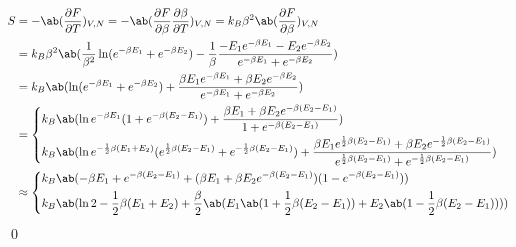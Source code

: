 \documentclass[uplatex,diffipdfmx,a4paper,11pt]{jlreq}
\makeatletter
\theoremstyle{definition}
\renewenvironment{proof}[1][\proofname]{\par
  \normalfont
  \topsep6\p@\@plus6\p@ \trivlist
  \item[\hskip\labelsep{\bfseries #1}\@addpunct{\bfseries}]\ignorespaces\quad\par
}{%
  \qed\endtrivlist\@endpefalse
}
\renewcommand\proofname{証明}
\makeatother
\begin{document}
\begin{proof}
\begin{align}
  \end{align}
  \begin{align}
    S & = - \ab(\diffp{F}{T})_{V,N} = - \ab(\diffp{F}{\beta}\diffp{\beta}{T})_{V,N} = k_B\beta^2\ab(\diffp{F}{\beta})_{V,N}                                                                                                                                                                                                                                                                   \\
      & = k_B\beta^2\ab(\frac{1}{\beta^2}\ln(e^{-\beta E_1} + e^{-\beta E_2}) - \frac{1}{\beta}\frac{-E_1e^{-\beta E_1} - E_2e^{-\beta E_2}}{e^{-\beta E_1} + e^{-\beta E_2}})                                                                                                                                                                                                                \\
      & = k_B\ab(\ln(e^{-\beta E_1} + e^{-\beta E_2}) + \frac{\beta E_1e^{-\beta E_1} + \beta E_2e^{-\beta E_2}}{e^{-\beta E_1} + e^{-\beta E_2}})                                                                                                                                                                                                                                            \\
      & = \begin{dcases}
            k_B\ab(\ln e^{-\beta E_1}(1 + e^{-\beta (E_2 - E_1)}) + \frac{\beta E_1 + \beta E_2e^{-\beta (E_2 - E_1)}}{1 + e^{-\beta (E_2 - E_1)}})                                                                                                                                                   \\
            k_B\ab(\ln e^{-\frac{1}{2}\beta (E_1 + E_2)}(e^{\frac{1}{2}\beta (E_2 - E_1)} + e^{-\frac{1}{2}\beta (E_2 - E_1)}) + \frac{\beta E_1e^{\frac{1}{2}\beta (E_2 - E_1)} + \beta E_2e^{-\frac{1}{2}\beta (E_2 - E_1)}}{e^{\frac{1}{2}\beta (E_2 - E_1)} + e^{-\frac{1}{2}\beta (E_2 - E_1)}}) \\
          \end{dcases} \\
      & \approx
    \begin{dcases}
      k_B\ab(-\beta E_1 + e^{-\beta (E_2 - E_1)} + (\beta E_1 + \beta E_2e^{-\beta (E_2 - E_1)})(1 - e^{-\beta (E_2 - E_1)}))                                \\
      k_B\ab(\ln 2 - \frac{1}{2}\beta (E_1 + E_2) + \frac{\beta}{2}\ab(E_1\ab(1 + \frac{1}{2}\beta (E_2 - E_1)) + E_2\ab(1 - \frac{1}{2}\beta (E_2 - E_1)))) \\

\end{dcases}
\end{align}
\end{proof}
\end{document}
